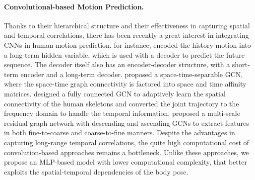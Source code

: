 \documentclass{article}
\begin{document}
\paragraph{Convolutional-based Motion Prediction.}
Thanks to their hierarchical structure and their effectiveness in capturing spatial and temporal correlations, there has been recently a great interest in integrating CNNs in human motion prediction. \cite{li2018convolutional} for instance, encoded the history motion into a long-term hidden variable, which is used with a decoder to predict the future sequence. The decoder itself also has an encoder-decoder structure, with a short-term encoder and a long-term decoder.  \cite{sofianos2021space} proposed a space-time-separable GCN, where the space-time graph connectivity is factored into space and time affinity matrices. \cite{mao2019learning} designed a fully connected GCN to adaptively learn the spatial connectivity of the human skeletons and converted the joint trajectory to the frequency domain to handle the temporal information. \cite{dang2021msr} proposed a multi-scale residual graph network with descending and ascending GCNs to extract features in both fine-to-coarse and coarse-to-fine manners. Despite the advantages in capturing long-range temporal correlations, the quite high computational cost of convolution-based approaches remains a bottleneck. Unlike these approaches, we propose an MLP-based model with lower computational complexity, that better exploits the spatial-temporal dependencies of the body pose. 
\end{document}
